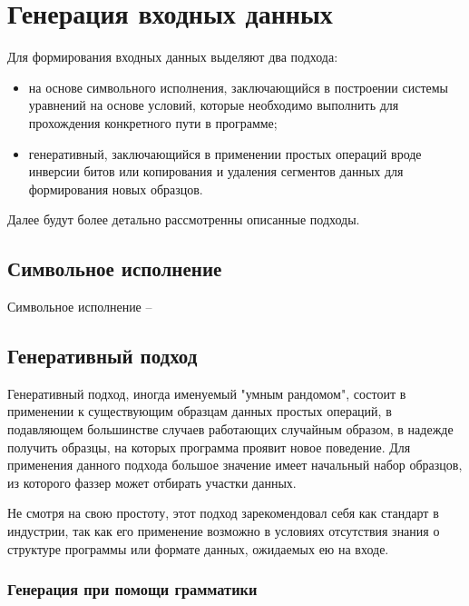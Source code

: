 \section{Генерация входных данных}

Для формирования входных данных выделяют два подхода:

\begin{itemize}
	
	\item на основе символьного исполнения, заключающийся в построении системы уравнений на основе условий, которые необходимо выполнить для прохождения конкретного пути в программе;
	
	\item генеративный, заключающийся в применении простых операций вроде инверсии битов или копирования и удаления сегментов данных для формирования новых образцов.
	
\end{itemize}

Далее будут более детально рассмотренны описанные подходы.

\subsection{Символьное исполнение}

Символьное исполнение -- 

\subsection{Генеративный подход}

Генеративный подход, иногда именуемый "умным рандомом", состоит в применении к существующим образцам данных простых операций, в подавляющем большинстве случаев работающих случайным образом, в надежде получить образцы, на которых программа проявит новое поведение. Для применения данного подхода большое значение имеет начальный набор образцов, из которого фаззер может отбирать участки данных.

Не смотря на свою простоту, этот подход зарекомендовал себя как стандарт в индустрии, так как его применение возможно в условиях отсутствия знания о структуре программы или формате данных, ожидаемых ею на входе.

\subsubsection{Генерация при помощи грамматики}

